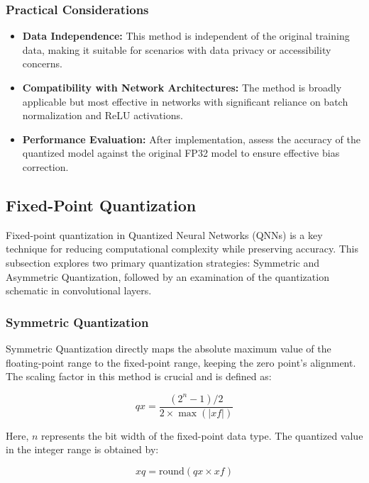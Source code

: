 \documentclass[10pt]{article}
\begin{document}
\subsubsection{Practical Considerations}
\begin{itemize}
    \item \textbf{Data Independence:} This method is independent of the original training data, making it suitable for scenarios with data privacy or accessibility concerns.
    \item \textbf{Compatibility with Network Architectures:} The method is broadly applicable but most effective in networks with significant reliance on batch normalization and ReLU activations.
    \item \textbf{Performance Evaluation:} After implementation, assess the accuracy of the quantized model against the original FP32 model to ensure effective bias correction.
\end{itemize}

\subsection{Fixed-Point Quantization}

Fixed-point quantization in Quantized Neural Networks (QNNs) is a key technique for reducing computational complexity while preserving accuracy. This subsection explores two primary quantization strategies: Symmetric and Asymmetric Quantization, followed by an examination of the quantization schematic in convolutional layers.

\subsubsection{Symmetric Quantization}

Symmetric Quantization directly maps the absolute maximum value of the floating-point range to the fixed-point range, keeping the zero point's alignment. The scaling factor in this method is crucial and is defined as:

\begin{equation}
    qx = \frac{(2^n - 1) / 2}{2 \times \max(\left| xf \right|)}
\end{equation}

Here, \( n \) represents the bit width of the fixed-point data type. The quantized value in the integer range is obtained by:

\begin{equation}
    xq = \text{round}(qx \times xf)
\end{equation}
\end{document}
